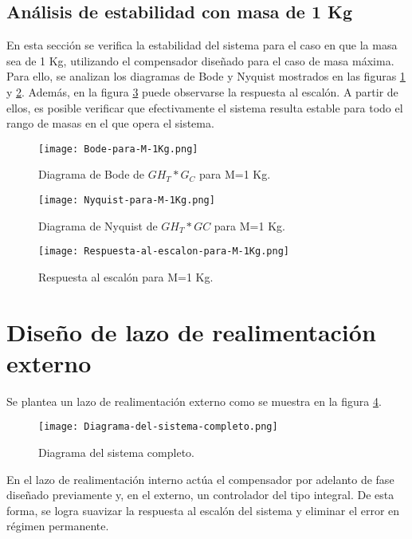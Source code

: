 \subsection{Análisis de estabilidad con masa de 1 Kg}

\noindent En esta secci\'{o}n se verifica la estabilidad del sistema  para el caso en que la masa sea de 1 Kg, utilizando el compensador dise\~{n}ado para el caso de masa m\'{a}xima. Para ello, se analizan los diagramas de Bode y Nyquist mostrados en las figuras \ref{fig:bode-para-M-1Kg} y \ref{fig:nyquist-para-M-1Kg}. Adem\'{a}s, en la figura \ref{fig:respuesta-al-escalon-para-M-1Kg} puede observarse la respuesta al escal\'{o}n. A partir de ellos, es posible verificar que efectivamente el sistema resulta estable para todo el rango de masas en el que opera el sistema. 


\begin{figure}[H]
	\centering
	\texttt{[image: Bode-para-M-1Kg.png]}
	\caption{Diagrama de Bode de $GH_T*G_C$ para M=1 Kg.}
	\label{fig:bode-para-M-1Kg}
\end{figure}

\begin{figure}[H]
	\centering
	\texttt{[image: Nyquist-para-M-1Kg.png]}
	\caption{Diagrama de Nyquist de $GH_T*GC$ para M=1 Kg.}
	\label{fig:nyquist-para-M-1Kg}
\end{figure}

\begin{figure}[H]
	\centering
	\texttt{[image: Respuesta-al-escalon-para-M-1Kg.png]}
	\caption{Respuesta al escalón para M=1 Kg.}
	\label{fig:respuesta-al-escalon-para-M-1Kg}
\end{figure}

\section{Diseño de lazo de realimentación externo}

\noindent Se plantea un lazo de realimentaci\'{o}n externo como se muestra en la  figura \ref{fig:diagrama-del-sistema-completo}.

\begin{figure}[H]
	\centering
	\texttt{[image: Diagrama-del-sistema-completo.png]}
	\caption{Diagrama del sistema completo.}
	\label{fig:diagrama-del-sistema-completo}
\end{figure}


\noindent En el lazo de realimentaci\'{o}n interno act\'{u}a el compensador por adelanto de fase dise\~{n}ado previamente y, en el externo, un controlador del tipo integral. De esta forma, se logra suavizar la respuesta al escal\'{o}n del sistema y eliminar el error en r\'{e}gimen permanente.


